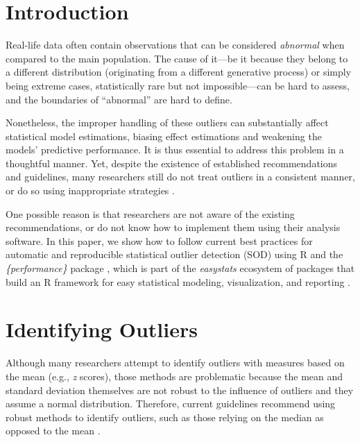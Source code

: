\documentclass[mathematics,article,submit,moreauthors,pdftex]{mdpi}
\begin{document}

\hypertarget{introduction}{%
\section{Introduction}\label{introduction}}

Real-life data often contain observations that can be considered
\emph{abnormal} when compared to the main population. The cause of
it---be it because they belong to a different distribution (originating
from a different generative process) or simply being extreme cases,
statistically rare but not impossible---can be hard to assess, and the
boundaries of ``abnormal'' are hard to define.

Nonetheless, the improper handling of these outliers can substantially
affect statistical model estimations, biasing effect estimations and
weakening the models' predictive performance. It is thus essential to
address this problem in a thoughtful manner. Yet, despite the existence
of established recommendations and guidelines, many researchers still do
not treat outliers in a consistent manner, or do so using inappropriate
strategies \citep{simmons2011false, leys2013outliers}.

One possible reason is that researchers are not aware of the existing
recommendations, or do not know how to implement them using their
analysis software. In this paper, we show how to follow current best
practices for automatic and reproducible statistical outlier detection
(SOD) using R and the \emph{\{performance\}} package
\citep{ludecke2021performance}, which is part of the \emph{easystats}
ecosystem of packages that build an R framework for easy statistical
modeling, visualization, and reporting \citep{easystatspackage}.

\hypertarget{identifying-outliers}{%
\section{Identifying Outliers}\label{identifying-outliers}}

Although many researchers attempt to identify outliers with measures
based on the mean (e.g., \emph{z} scores), those methods are problematic
because the mean and standard deviation themselves are not robust to the
influence of outliers and they assume a normal distribution. Therefore,
current guidelines recommend using robust methods to identify outliers,
such as those relying on the median as opposed to the mean
\citep{leys2019outliers, leys2013outliers, leys2018outliers}.
\end{document}
